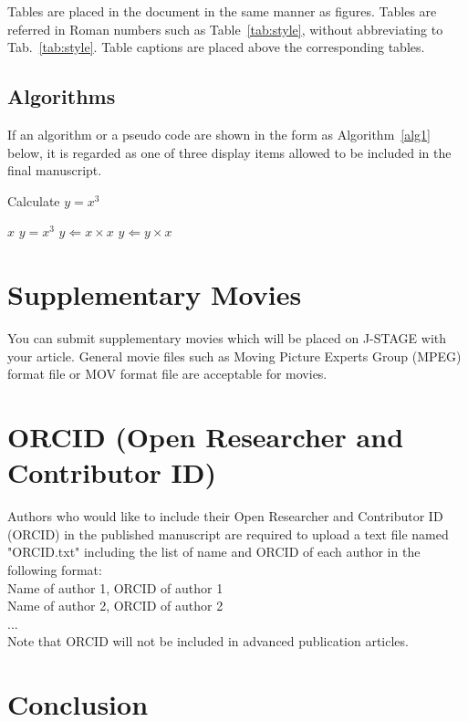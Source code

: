 \documentclass{comex}
\begin{document}
Tables are placed in the document in the same manner as figures. Tables
are referred in Roman numbers such as Table~\ref{tab:style}, without
abbreviating to Tab.~\ref{tab:style}. Table captions are placed above
the corresponding tables.

\subsection{Algorithms}
If an algorithm or a pseudo code are shown in the form as Algorithm~\ref{alg1} below,
it is regarded as one of three display items allowed to be included in the final manuscript.
 
\begin{algorithm}[h]
\caption{Calculate $y = x^3$}
\label{alg1}
\begin{algorithmic}
\REQUIRE $x$
\ENSURE $y = x^3$
\STATE $y \Leftarrow x \times x$
\STATE $y \Leftarrow y \times x$
\end{algorithmic}
\end{algorithm}

\section{Supplementary Movies}

You can submit supplementary movies which will be placed on J-STAGE with your article.
General movie files such as Moving Picture Experts
Group (MPEG) format file or MOV format file are acceptable for movies.

\section{ORCID (Open Researcher and Contributor ID)}

Authors who would like to include their Open Researcher and Contributor ID (ORCID) in the
 published manuscript are required to upload a text file named "ORCID.txt" including 
 the list of name and ORCID of each author in the following format:\\
Name of author 1, ORCID of author 1\\
Name of author 2, ORCID of author 2\\
...\\
Note that ORCID will not be included in advanced publication articles.

\section{Conclusion}
\end{document}
